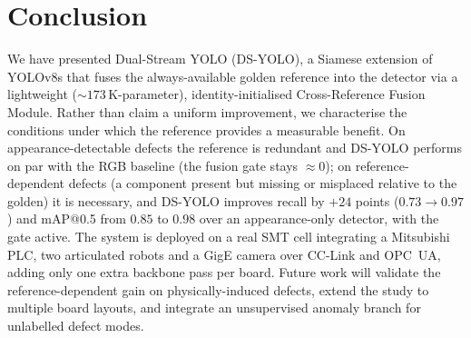 \documentclass[conference]{IEEEtran}
\begin{document}
\section{Conclusion}
\label{sec:concl}

We have presented Dual-Stream YOLO (DS-YOLO), a Siamese extension of YOLOv8s that
fuses the always-available golden reference into the detector via a lightweight
($\sim\!173\,$K-parameter), identity-initialised Cross-Reference Fusion Module.
Rather than claim a uniform improvement, we characterise the conditions under which
the reference provides a measurable benefit. On appearance-detectable defects the
reference is redundant and DS-YOLO performs on par with the RGB baseline (the
fusion gate stays $\approx\!0$); on
reference-dependent defects (a component present but missing or misplaced relative
to the golden) it is necessary, and DS-YOLO improves recall by $+24$ points
($0.73\!\rightarrow\!0.97$) and mAP@0.5 from $0.85$ to $0.98$ over an
appearance-only detector, with the gate active. The system is deployed on a
real SMT cell integrating a Mitsubishi PLC, two articulated robots and a GigE
camera over CC-Link and OPC~UA, adding only one extra backbone pass per board.
Future work will validate the reference-dependent gain on physically-induced
defects, extend the study to multiple board layouts, and integrate an
unsupervised anomaly branch for unlabelled defect modes.



\end{document}
